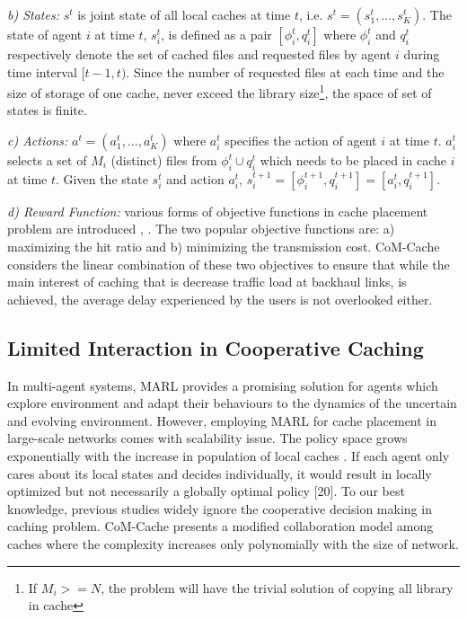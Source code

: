 \documentclass[journal,onecolumn]{IEEEtran}
\begin{document}
\textit{b) States:} $s^t$ is joint state of all local caches at time $t$, i.e. ${s}^t = (s_1^t,...,s_K^t)$. The state of agent $i$ at time $t$, $s_i^t$, is defined as a pair $[\phi_i^t,q_i^t]$ where $\phi_i^t$  and  $q_i^t$ respectively denote the set of cached files and requested files by agent $i$ during time interval $[t-1,t)$. Since the number of requested files at each time and the size of storage of one cache, never exceed the library size\footnote{If $M_i >= N$, the problem will have the trivial solution of copying all library in cache}, the space of set of states is finite. 

\textit{c) Actions:} ${a}^t= (a_1^t,...,a_K^t)$ where $a_i^t$ specifies the action of agent $i$ at time $t$. $a_i^t$  selects a set of  $M_i$ (distinct) files from $\phi_i^t\cup q_i^t$ which needs to be placed in cache $i$ at time $t$. Given the state $s_i^t$ and action $a_i^t$, $s_i^{t+1} = [\phi_i^{t+1}, q_i^{t+1}] = [a_i^t, q_i^{t+1}]$.


\textit{d) Reward Function:} various forms of objective functions in cache placement problem are introduced \cite{li2016popularity}, \cite{hachem2015content}. The two popular objective functions are: a) maximizing the hit ratio and b) minimizing the transmission cost. CoM-Cache considers the linear combination of these two objectives to ensure that while the main interest of caching that is decrease traffic load at backhaul links, is achieved, the average delay experienced by the users is not overlooked either.


\subsection{Limited Interaction in Cooperative Caching}

In multi-agent systems, MARL provides a promising solution for agents which explore environment and adapt their behaviours to the dynamics of the uncertain and evolving environment. However, employing MARL for cache placement in large-scale networks comes with scalability issue. The policy space grows exponentially with the increase in population of local caches \cite{zhang2011coordinated}.
If each agent only cares about its local states and decides individually, it would result in locally optimized but not necessarily a globally optimal policy [20]. To our best knowledge, previous studies widely ignore the cooperative decision making in caching problem. CoM-Cache presents a modified collaboration model among caches where the complexity increases only polynomially with the size of network.
\end{document}
